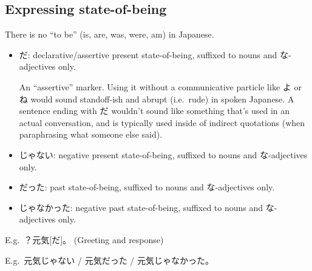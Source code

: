 \documentclass[../nihongo-gakushuu-kyouzai.tex]{subfiles}
\begin{document}
\subsection{Expressing state-of-being}
There is no ``to be'' (is, are, was, were, am) in Japanese.
\begin{itemize}
    \item だ: declarative/assertive present state-of-being, suffixed to nouns and な-adjectives only.

    An ``assertive'' marker. Using it without a communicative particle like よ or ね would sound standoff-ish and abrupt (i.e.\ rude) in spoken Japanese. A sentence ending with だ wouldn't sound like something that's used in an actual conversation, and is typically used inside of indirect quotations (when paraphrasing what someone else said).


    \item じゃない: negative present state-of-being, suffixed to nouns and な-adjectives only.


    \item だった: past state-of-being, suffixed to nouns and な-adjectives only.
    \item じゃなかった: negative past state-of-being, suffixed to nouns and な-adjectives only.

\end{itemize}

E.g.\ ？元気[だ]。 (Greeting and response)

E.g.\ 元気じゃない / 元気だった / 元気じゃなかった。
\end{document}
